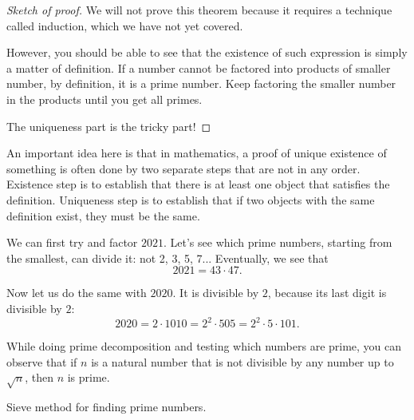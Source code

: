 \begin{proof}[Sketch of proof]
We will not prove this theorem because it requires a technique called induction, 
which we have not yet covered.

However, you should be able to see that the existence of such expression is simply 
a matter of definition. If a number cannot be factored into products of smaller number,
by definition, it is a prime number. Keep factoring the smaller number in the products until you get all primes.

The uniqueness part is the tricky part!
\end{proof}

\begin{remark}
   An important idea here is that in mathematics, a proof of unique existence of something
   is often done by two separate steps that are not in any order.
   Existence step is to establish that there is at least one object that satisfies the definition. 
   Uniqueness step is to establish that if two objects with the same definition exist,
   they must be the same.
\end{remark}


\begin{example}
We can first try and factor $2021$. Let's see which prime numbers, starting from the smallest, can divide it: not 2, 3, 5, 7... Eventually, we see that
$$ 2021 = 43 \cdot 47
.$$

Now let us do the same with $2020$. It is divisible by $2$, because its last digit is divisible by $2$:
$$ 2020 = 2 \cdot 1010 = 2^2 \cdot 505 = 2^2 \cdot 5 \cdot 101
.$$
\end{example}

While doing prime decomposition and testing which numbers are prime, you can observe that if $n$ is a natural number that is not divisible by any number up to $\sqrt{n}$, then $n$ is prime.

Sieve method for finding prime numbers.

